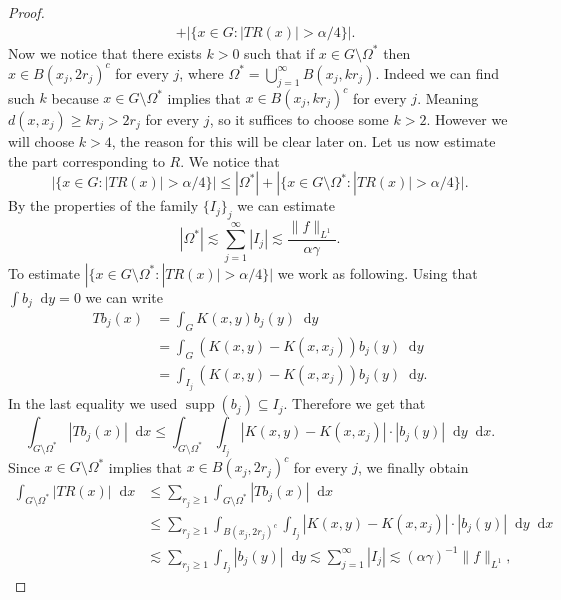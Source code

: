 \documentclass[12pt, reqno]{amsart}
\theoremstyle{definition}
\theoremstyle{remark}
\numberwithin{equation}{section}
\newcommand*\diff{\mathop{}\!\mathrm{d}}
\begin{document}
\begin{proof}
\begin{eqnarray*}
     &+|\{x\in G:|TR(x)|>\alpha/4\}|.
\end{eqnarray*}
     Now we notice that there exists $k>0$ such that if $x\in G\setminus \Omega^*$ then $x\in B(x_j,2r_j)^c$ for every $j$, where $\Omega^*=\bigcup_{j=1}^{\infty}B(x_j,kr_j)$. Indeed we can find such $k$ because $x\in G\setminus\Omega^*$ implies that $x\in B(x_j,kr_j)^c$ for every $j$. Meaning $d(x,x_j)\geq kr_j>2r_j$ for every $j$, so it suffices to choose some $k>2$. However we will choose $k>4$, the reason for this will be clear later on. Let us now estimate the part corresponding to $R$. We notice that
    \begin{equation*}
        |\{x\in G:|TR(x)|>\alpha/4\}|\leq|\Omega^*|+|\{x\in G\setminus\Omega^*:|TR(x)|>\alpha/4\}|.
    \end{equation*}
    By the properties of the family $\{I_j\}_j$ we can estimate
    \begin{equation*}
        |\Omega^*|\lesssim\sum_{j=1}^{\infty}|I_j|\lesssim\frac{\|f\|_{L^1}}{\alpha\gamma}.
    \end{equation*}
    To estimate $|\{x\in G\setminus\Omega^*: |TR(x)|>\alpha/4\}|$ we work as following. Using that $\int b_j\diff{y}=0$ we can write
    \begin{equation*}
    \begin{aligned}
        Tb_j(x)&=\int_{G}K(x,y)b_j(y)\diff{y}\\
        &=\int_{G}(K(x,y)-K(x,x_j))b_j(y)\diff{y}\\
        &=\int_{I_j}(K(x,y)-K(x,x_j))b_j(y)\diff{y}.
    \end{aligned}
     \end{equation*}
    In the last equality we used $\operatorname{supp}(b_j)\subseteq I_j$. Therefore we get that
    \begin{equation*}
        \int_{G\setminus\Omega^*}|Tb_j(x)|\diff{x}\leq\int_{G\setminus\Omega^*}\int_{I_j}|K(x,y)-K(x,x_j)|\cdot|b_j(y)|\diff{y}\diff{x}.
    \end{equation*}
    Since $x\in G\setminus\Omega^*$ implies that $x\in B(x_j,2r_j)^c$ for every $j$, we finally obtain 
    \begin{equation*}
    \begin{aligned}
        \int_{G\setminus\Omega^*}|TR(x)|\diff{x}&\leq\sum_{r_j\geq 1}\int_{G\setminus\Omega^*}|Tb_j(x)|\diff{x}\\
        &\leq\sum_{r_j\geq 1}\int_{B(x_j,2r_j)^c}\int_{I_j}|K(x,y)-K(x,x_j)|\cdot|b_j(y)|\diff{y}\diff{x}\\
        &\lesssim\sum_{r_j\geq 1}\int_{I_j}|b_j(y)|\diff{y}\lesssim\sum_{j=1}^{\infty}|I_j|\lesssim(\alpha\gamma)^{-1}\|f\|_{L^1},

\end{aligned}
\end{equation*}
\end{proof}
\end{document}

